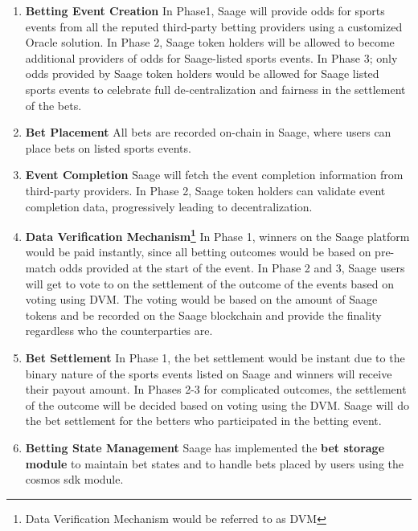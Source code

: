 \documentclass[%
 reprint,
 amsmath,amssymb,
 aps,
]{revtex4-2}
\begin{document}
\begin{enumerate}

\item \textbf{Betting Event Creation} In Phase1, Saage will provide odds for sports events from all the reputed third-party betting providers using a customized Oracle solution. In Phase 2, Saage token holders will be allowed to become additional providers of odds for Saage-listed sports events. In Phase 3; only odds provided by Saage token holders would be allowed for Saage listed sports events to celebrate full de-centralization and fairness in the settlement of the bets. 

\item \textbf{Bet Placement} All bets are recorded on-chain in Saage, where users can place bets on listed sports events.

\item \textbf{Event Completion} Saage will fetch the event completion information from third-party providers. In Phase 2, Saage token holders can validate event completion data, progressively leading to decentralization.

\item \textbf{Data Verification Mechanism\footnote{Data Verification Mechanism would be referred to as DVM}} In Phase 1, winners on the Saage platform would be paid instantly, since all betting outcomes would be based on pre-match odds provided at the start of the event. In Phase 2 and 3, Saage users will get to vote to on the settlement of the outcome of the events based on voting using DVM. The voting would be based on the amount of Saage tokens and be recorded on the Saage blockchain and provide the finality regardless who the counterparties are.

\item \textbf{Bet Settlement} In Phase 1, the bet settlement would be instant due to the binary nature of the sports events listed on Saage and winners will receive their payout amount. In Phases 2-3 for complicated outcomes, the settlement of the outcome will be decided based on voting using the DVM. Saage will do the bet settlement for the betters who participated in the betting event. 

\item \textbf{Betting State Management} Saage has implemented the \textbf{bet storage module} to maintain bet states and to handle bets placed by users using the cosmos sdk module. 

\end{enumerate}
\end{document}
